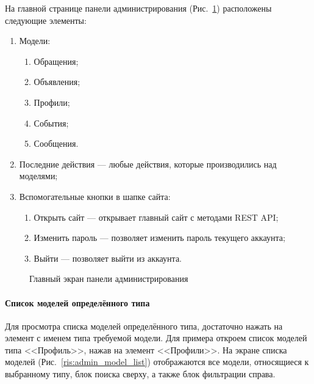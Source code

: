 \documentclass{../includes/TechDoc}
\begin{document}
    На главной странице панели администрирования (Рис.~\ref{ris:admin_main}) расположены следующие элементы:
    \begin{enumerate}
        \item Модели:
        \begin{enumerate}
            \item Обращения;
            \item Объявления;
            \item Профили;
            \item События;
            \item Сообщения.
        \end{enumerate}
        \item Последние действия — любые действия, которые производились над моделями;
        \item Вспомогательные кнопки в шапке сайта:
        \begin{enumerate}
            \item Открыть сайт — открывает главный сайт с методами REST API;
            \item Изменить пароль — позволяет изменить пароль текущего аккаунта;
            \item Выйти — позволяет выйти из аккаунта.
        \end{enumerate}
    \end{enumerate}
    \begin{figure}[ht]
        \centering
        \caption{Главный экран панели администрирования}
        \label{ris:admin_main}
    \end{figure}

    \clearpage

    \paragraph{Список моделей определённого типа}

    Для просмотра списка моделей определённого типа, достаточно нажать на элемент с именем типа требуемой модели.
    Для примера откроем список моделей типа <<Профиль>>, нажав на элемент <<Профили>>.
    На экране списка моделей (Рис.~\ref{ris:admin_model_list}) отображаются все модели, относящиеся к выбранному типу, блок поиска сверху, а также блок фильтрации справа.
\end{document}
